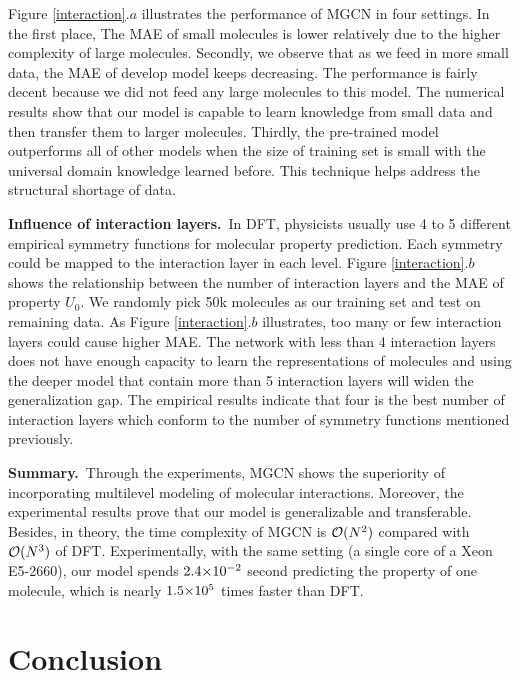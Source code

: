 \documentclass[letterpaper]{article} \usepackage{bm}
\begin{document}
Figure \ref{interaction}.$a$ illustrates the performance of MGCN in four settings. In the first place, The MAE of small molecules is lower relatively due to the higher complexity of large molecules. Secondly, we observe that as we feed in more small data, the MAE of develop model keeps decreasing. The performance is fairly decent because we did not feed any large molecules to this model. The numerical results show that our model is capable to learn knowledge from small data and then transfer them to larger molecules. Thirdly, the pre-trained model outperforms all of other models when the size of training set is small with the universal domain knowledge learned before. This technique helps address the structural shortage of data.


\textbf{Influence of interaction layers.}\ In DFT, physicists usually use 4 to 5 different empirical symmetry functions for molecular property prediction. Each symmetry could be mapped to the interaction layer in each level. Figure \ref{interaction}.$b$ shows the relationship between the number of interaction layers and the MAE of property $U_0$. We randomly pick 50k molecules as our training set and test on remaining data. As Figure \ref{interaction}.$b$ illustrates, too many or few interaction layers could cause higher MAE. The network with less than 4 interaction layers does not have enough capacity to learn the representations of molecules and using the deeper model that contain more than 5 interaction layers will widen the generalization gap. The empirical results indicate that four is the best number of interaction layers which conform to the number of symmetry functions mentioned previously. 

\textbf{Summary.}\ Through the experiments, MGCN shows the superiority of incorporating multilevel modeling of molecular interactions. Moreover, the experimental results prove that our model is generalizable and transferable. Besides, in theory, the time complexity of MGCN is $\scriptsize{\mathcal{O}(N^2)}$ compared with $\scriptsize{\mathcal{O}(N^3)}$ of DFT. Experimentally, with the same setting (a single core of a Xeon E5-2660), our model spends $\scriptsize{2.4\scriptsize{\times}10^{-2}}$ second predicting the property of one molecule, which is nearly $\scriptsize{1.5\scriptsize{\times}10^{5}}$ times faster than DFT. 


 
\section{Conclusion}
\end{document}
